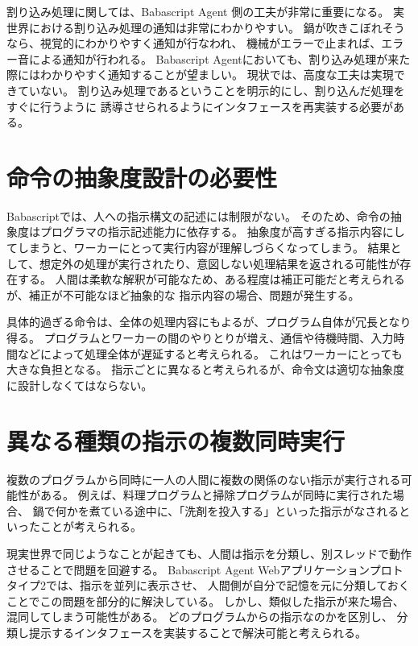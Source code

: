 割り込み処理に関しては、Babascript Agent 側の工夫が非常に重要になる。
実世界における割り込み処理の通知は非常にわかりやすい。
鍋が吹きこぼれそうなら、視覚的にわかりやすく通知が行なわれ、
機械がエラーで止まれば、エラー音による通知が行われる。 Babascript
Agentにおいても、割り込み処理が来た際にはわかりやすく通知することが望ましい。
現状では、高度な工夫は実現できていない。
割り込み処理であるということを明示的にし、割り込んだ処理をすぐに行うように
誘導させられるようにインタフェースを再実装する必要がある。

\section{命令の抽象度設計の必要性}\label{ux547dux4ee4ux306eux62bdux8c61ux5ea6ux8a2dux8a08ux306eux5fc5ux8981ux6027}

Babascriptでは、人への指示構文の記述には制限がない。
そのため、命令の抽象度はプログラマの指示記述能力に依存する。
抽象度が高すぎる指示内容にしてしまうと、ワーカーにとって実行内容が理解しづらくなってしまう。
結果として、想定外の処理が実行されたり、意図しない処理結果を返される可能性が存在する。
人間は柔軟な解釈が可能なため、ある程度は補正可能だと考えられるが、補正が不可能なほど抽象的な
指示内容の場合、問題が発生する。

具体的過ぎる命令は、全体の処理内容にもよるが、プログラム自体が冗長となり得る。
プログラムとワーカーの間のやりとりが増え、通信や待機時間、入力時間などによって処理全体が遅延すると考えられる。
これはワーカーにとっても大きな負担となる。
指示ごとに異なると考えられるが、命令文は適切な抽象度に設計しなくてはならない。

\section{異なる種類の指示の複数同時実行}\label{ux7570ux306aux308bux7a2eux985eux306eux6307ux793aux306eux8907ux6570ux540cux6642ux5b9fux884c}

複数のプログラムから同時に一人の人間に複数の関係のない指示が実行される可能性がある。
例えば、料理プログラムと掃除プログラムが同時に実行された場合、
鍋で何かを煮ている途中に、「洗剤を投入する」といった指示がなされるといったことが考えられる。

現実世界で同じようなことが起きても、人間は指示を分類し、別スレッドで動作させることで問題を回避する。
Babascript Agent
Webアプリケーションプロトタイプ2では、指示を並列に表示させ、
人間側が自分で記憶を元に分類しておくことでこの問題を部分的に解決している。
しかし、類似した指示が来た場合、混同してしまう可能性がある。
どのプログラムからの指示なのかを区別し、
分類し提示するインタフェースを実装することで解決可能と考えられる。


